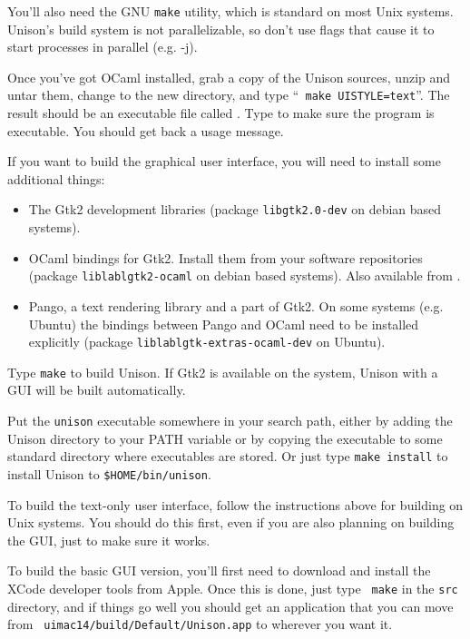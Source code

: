 \documentclass{article}
\begin{document}
You'll also need the GNU {\tt make} utility, which is standard on most Unix
systems.  Unison's build system is not parallelizable, so don't use flags
that cause it to start processes in parallel (e.g. -j).

Once you've got OCaml installed, grab a copy of the Unison sources, unzip
and untar them, change to the new  directory, and type ``{\tt
  make UISTYLE=text}''.  The result should be an executable file called
.  Type  to make sure the program is
executable.  You should get back a usage message.

If you want to build the graphical user interface, you will need to install
some additional things:
\begin{itemize}
\item The Gtk2 development libraries (package {\tt libgtk2.0-dev} on debian
based systems).
\item OCaml bindings for Gtk2. Install them from your software repositories
(package {\tt liblablgtk2-ocaml} on debian based systems). Also available
from .
\item Pango, a text rendering library and a part of Gtk2. On some systems
(e.g. Ubuntu) the bindings between Pango and OCaml need to be installed
explicitly (package {\tt liblablgtk-extras-ocaml-dev} on Ubuntu).
\end{itemize}
Type {\tt make} to build Unison. If Gtk2 is available on the system, Unison
with a GUI will be built automatically.

Put the \verb|unison| executable somewhere in your search path, either by
adding the Unison directory to your PATH variable or by copying the
executable to some standard directory where executables are stored.  Or just
type {\tt make install} to install Unison to {\tt \$HOME/bin/unison}.


To build the text-only user interface, follow the instructions above for
building on Unix systems.  You should do this first, even if you are also
planning on building the GUI, just to make sure it works.

To build the basic GUI version, you'll first need to download and install
the XCode developer tools from Apple.  Once this is done, just type {\tt
  make} in the {\tt src} directory, and if things go well you
should get an application that you can move from {\tt
  uimac14/build/Default/Unison.app} to wherever you want it.
\end{document}
